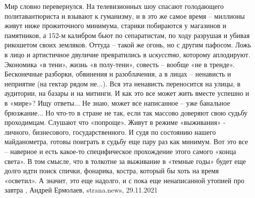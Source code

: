 Мир словно перевернулся. На телевизионных шоу спасают голодающего
политавантюриста и взывают к гуманизму, и в это же самое время – миллионы живут
ниже прожиточного минимума, старики побираются у магазинов и памятников, а
152-м калибром бьют по сепаратистам, по ходу разрушая и убивая рикошетом своих
земляков. Оттуда – такой же огонь, но с другим пафосом.  Ложь в лицо и
артистичное двуличие превратились в \emph{искусство}, которому аплодируют. Экономика
«в тени», жизнь «в полу-тени», совесть – вообще «не в тренде». Бесконечные
разборки, обвинения и разоблачения, а в лицах – ненависть и неприятие (на
гектар рядом не...). Вся эта ненависть переносится на улицы, в аудитории, на
базары и на митинги. И как это все может жить вместе успешно и в «мире»? Ищу
ответы...  Не знаю, может все написанное – уже банальное брюзжание... Но что-то в
стране не так, если так массово доверяют свою судьбу проходимцам. Слушают что
«попроще».  Живут в режиме «выживания» - личного, бизнесового,
государственного. И судя по состоянию нашего майданометра, готовы поиграть в
судьбу еще пару раз как минимум.  Вот это все – наверное и есть какое-то
специфическое прохождение этого самого «конца света». В том смысле, что в
толкотне за выживание в «темные годы» будет еще долго идти поиск спички,
фонарика, костра, который бы хоть на время «осветил». А значит, это еще
надолго, и с пока еще ненаписанной утопией про завтра
, Андрей Ермолаев, strana.news, 29.11.2021
